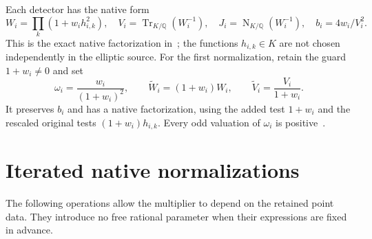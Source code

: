 \documentclass[11pt,a4paper]{article}
\newcommand{\Q}{\mathbb Q}\newcommand{\Z}{\mathbb Z}
\DeclareMathOperator{\Tr}{Tr}\DeclareMathOperator{\Nm}{N}
\begin{document}
Each detector has the native form
\begin{equation}\label{eq:native}
 W_i=\prod_k(1+w_i h_{i,k}^2),\quad
 V_i=\Tr_{K/\Q}(W_i^{-1}),\quad
 J_i=\Nm_{K/\Q}(W_i^{-1}),\quad b_i=4w_i/V_i^2.
\end{equation}
This is the exact native factorization in~\cite{Adaptive}; the functions
$h_{i,k}\in K$ are not chosen independently in the elliptic source.
For the first normalization, retain the guard $1+w_i\ne0$ and set
\begin{equation}\label{eq:first}
 \omega_i=\frac{w_i}{(1+w_i)^2},\qquad
 \widetilde W_i=(1+w_i)W_i,\qquad
 \widetilde V_i=\frac{V_i}{1+w_i}.
\end{equation}
It preserves $b_i$ and has a native factorization, using the added test
$1+w_i$ and the rescaled original tests $(1+w_i)h_{i,k}$.
Every odd valuation of $\omega_i$ is positive~\cite{Adaptive}.

\section{Iterated native normalizations}

The following operations allow the multiplier to depend on the retained
point data. They introduce no free rational parameter when their
expressions are fixed in advance.
\end{document}
